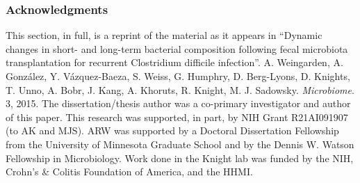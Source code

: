 \subsubsection{Acknowledgments}

This section, in full, is a reprint of the material as it appears in ``Dynamic 
changes in short- and long-term bacterial composition following fecal 
microbiota transplantation for recurrent Clostridium difficile infection''.  A.  
Weingarden, A. Gonz\'alez, Y.  V\'azquez-Baeza, S. Weiss, G.  Humphry, D.  
Berg-Lyons, D. Knights, T.  Unno, A. Bobr, J.  Kang, A. Khoruts, R.  Knight, M.  
J. Sadowsky. \emph{Microbiome}. 3, 2015.  The dissertation/thesis author was a 
co-primary investigator and author of this paper. This research was supported, 
in part, by NIH Grant R21AI091907 (to AK and MJS). ARW was supported by a 
Doctoral Dissertation Fellowship from the University of Minnesota Graduate 
School and by the Dennis W.  Watson Fellowship in Microbiology. Work done in 
the Knight lab was funded by the NIH, Crohn's \& Colitis Foundation of America, 
and the HHMI.  
